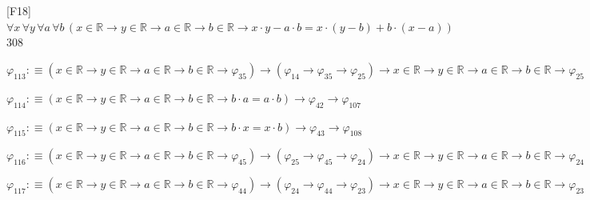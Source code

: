 \begin{fullproof}{[F18]}{$\forall x\,\forall y\,\forall a\,\forall b\,(x \in \mathbb{R} \to y \in \mathbb{R} \to a \in \mathbb{R} \to b \in \mathbb{R} \to x \cdot y - a \cdot b = x \cdot (y - b) + b \cdot (x - a))$}{308}
\begin{abbrevlist}
\item $\varphi_{113} :\equiv (x \in \mathbb{R} \to y \in \mathbb{R} \to a \in \mathbb{R} \to b \in \mathbb{R} \to \varphi_{35}) \to (\varphi_{14} \to \varphi_{35} \to \varphi_{25}) \to x \in \mathbb{R} \to y \in \mathbb{R} \to a \in \mathbb{R} \to b \in \mathbb{R} \to \varphi_{25}$
\item $\varphi_{114} :\equiv (x \in \mathbb{R} \to y \in \mathbb{R} \to a \in \mathbb{R} \to b \in \mathbb{R} \to b \cdot a = a \cdot b) \to \varphi_{42} \to \varphi_{107}$
\item $\varphi_{115} :\equiv (x \in \mathbb{R} \to y \in \mathbb{R} \to a \in \mathbb{R} \to b \in \mathbb{R} \to b \cdot x = x \cdot b) \to \varphi_{43} \to \varphi_{108}$
\item $\varphi_{116} :\equiv (x \in \mathbb{R} \to y \in \mathbb{R} \to a \in \mathbb{R} \to b \in \mathbb{R} \to \varphi_{45}) \to (\varphi_{25} \to \varphi_{45} \to \varphi_{24}) \to x \in \mathbb{R} \to y \in \mathbb{R} \to a \in \mathbb{R} \to b \in \mathbb{R} \to \varphi_{24}$
\item $\varphi_{117} :\equiv (x \in \mathbb{R} \to y \in \mathbb{R} \to a \in \mathbb{R} \to b \in \mathbb{R} \to \varphi_{44}) \to (\varphi_{24} \to \varphi_{44} \to \varphi_{23}) \to x \in \mathbb{R} \to y \in \mathbb{R} \to a \in \mathbb{R} \to b \in \mathbb{R} \to \varphi_{23}$
\end{abbrevlist}
\end{fullproof}
